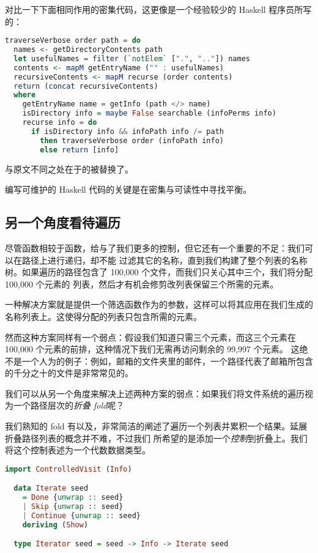 \documentclass[./main.tex]{subfiles}
\begin{document}
对比一下下面相同作用的密集代码，这更像是一个经验较少的 Haskell 程序员所写的：

\begin{lstlisting}[language=Haskell]
  traverseVerbose order path = do
  names <- getDirectoryContents path
  let usefulNames = filter (`notElem` [".", ".."]) names
  contents <- mapM getEntryName ("" : usefulNames)
  recursiveContents <- mapM recurse (order contents)
  return (concat recursiveContents)
  where
    getEntryName name = getInfo (path </> name)
    isDirectory info = maybe False searchable (infoPerms info)
    recurse info = do
      if isDirectory info && infoPath info /= path
        then traverseVerbose order (infoPath info)
        else return [info]
\end{lstlisting}

与原文不同之处在于的被替换了。

编写可维护的 Haskell 代码的关键是在密集与可读性中寻找平衡。

\subsection*{另一个角度看待遍历}

尽管函数相较于函数，给与了我们更多的控制，但它还有一个重要的不足：我们可以在路径上进行递归，却不能
过滤其它的名称，直到我们构建了整个列表的名称树。如果遍历的路径包含了 100,000 个文件，而我们只关心其中三个，我们将分配 100,000 个元素的
列表，然后才有机会修剪改列表保留三个所需的元素。

一种解决方案就是提供一个筛选函数作为的参数，这样可以将其应用在我们生成的名称列表上。这使得分配的列表只包含所需的元素。

然而这种方案同样有一个弱点：假设我们知道只需三个元素，而这三个元素在 100,000 个元素的前排，这种情况下我们无需再访问剩余的 99,997 个元素。
这绝不是一个人为的例子：例如，邮箱的文件夹里的邮件，一个路径代表了邮箱所包含的千分之十的文件是非常常见的。

我们可以从另一个角度来解决上述两种方案的弱点：如果我们将文件系统的遍历视为一个路径层次的\textit{折叠 fold}呢？

我们熟知的 fold 有以及，非常简洁的阐述了遍历一个列表并累积一个结果。延展折叠路径列表的概念并不难，不过我们
所希望的是添加一个\textit{控制}到折叠上。我们将这个控制表述为一个代数数据类型。

\begin{lstlisting}[language=Haskell]
  import ControlledVisit (Info)

  data Iterate seed
    = Done {unwrap :: seed}
    | Skip {unwrap :: seed}
    | Continue {unwrap :: seed}
    deriving (Show)

  type Iterator seed = seed -> Info -> Iterate seed
\end{lstlisting}
\end{document}
